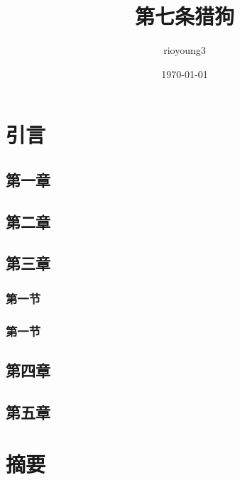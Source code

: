 \documentclass{book} %
\title{第七条猎狗}
\author{rioyoung3}
\date{\today}
\begin{document}
	\maketitle
	\tableofcontents
	
	\chapter{引言}
	
	\section{第一章}
	\section{第二章}
	\section{第三章}
	\subsection{第一节}
	\subsection{第一节}
	\section{第四章}
	\section{第五章}
	
	\chapter{摘要}
\end{document}
